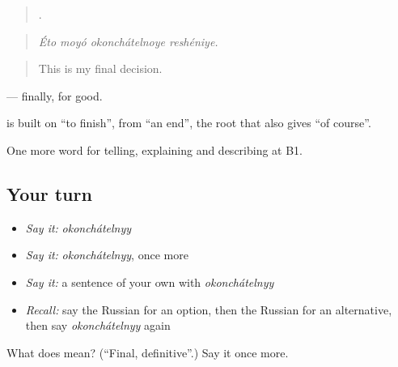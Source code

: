 \begin{quote}
   .
\end{quote}

\begin{quote}
\emph{Éto moyó okonchátelnoye reshéniye.}
\end{quote}

\begin{quote}
This is my final decision.
\end{quote}

\emph{} — finally, for good.

\begin{cousinweb}
\textbf{} is built on \emph{} \textquotedblleft{}to finish\textquotedblright{}, from \emph{} \textquotedblleft{}an end\textquotedblright{}, the root that also gives \emph{} \textquotedblleft{}of course\textquotedblright{}.
\end{cousinweb}

\begin{grammarlens}[title={What you've built}]
One more word for telling, explaining and describing at B1.
\end{grammarlens}

\subsection*{Your turn}
\begin{itemize}
\raggedright
  \item \emph{Say it:} \emph{okonchátelnyy}
  \item \emph{Say it:} \emph{okonchátelnyy}, once more
  \item \emph{Say it:} a sentence of your own with \emph{okonchátelnyy}
  \item \emph{Recall:} say the Russian for an option, then the Russian for an alternative, then say \emph{okonchátelnyy} again
\end{itemize}

\begin{tcolorbox}[breakable,colback=teal!4,colframe=teal!35!black,title={Before you move on}]
What does  mean? (\textquotedblleft{}Final, definitive\textquotedblright{}.) Say it once more.
\end{tcolorbox}
